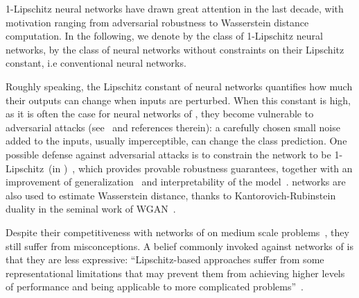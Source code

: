 1-Lipschitz neural networks have drawn great attention in the last decade, with motivation ranging from adversarial robustness to Wasserstein distance computation. In the following, we denote by \textbf{\LipCl} the class of 1-Lipschitz neural networks, by \textbf{\LipInf} the class of neural networks without constraints on their Lipschitz constant, i.e conventional neural networks.%

Roughly speaking, the Lipschitz constant of neural networks quantifies how much their outputs can change when inputs are perturbed. When this constant is high, as it is often the case for neural networks of \LipInf, they become vulnerable to adversarial attacks (see~\cite{szegedy2013intriguing,yuan2019adversarial} and references therein): a carefully chosen small noise added to the inputs, usually imperceptible, can change the class prediction. One possible defense against adversarial attacks is to constrain the network to be 1-Lipschitz~(in \LipCl)~\cite{li2019preventing}, which provides provable robustness guarantees, together with an improvement of generalization~\cite{Sokolic_2017} and interpretability of the model~\cite{tsipras2019robustness}. \LipCl networks are also used to estimate Wasserstein distance, thanks to Kantorovich-Rubinstein duality in the seminal work of WGAN~\cite{arjovsky2017wasserstein}.  

  
Despite their competitiveness with networks of \LipInf on medium scale problems~\cite{cisse2017parseval,serrurier2020achieving}, they still suffer from misconceptions. A belief commonly invoked against networks of \LipCl is that they are less expressive: ``Lipschitz-based approaches suffer from some representational limitations that may prevent them from achieving higher levels of performance and being applicable to more complicated problems''~\cite{huster2018limitations}.%

